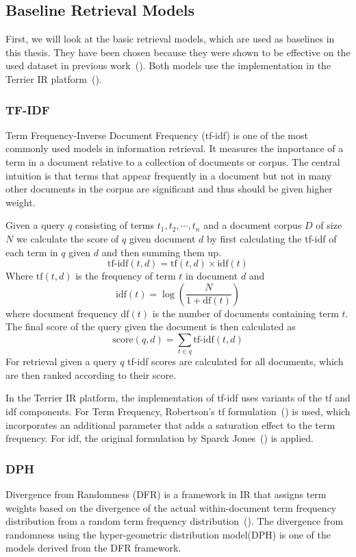 \subsection{Baseline Retrieval Models}\label{sec:baseline-retrieval-models}
First, we will look at the basic retrieval models, which are used as baselines in this thesis.
They have been chosen because they were shown to be effective on the used dataset in previous work~(\cite{goeuriot:2021:Consumer}).
Both models use the implementation in the Terrier IR platform~(\cite{ounis:2005:Terrier}).

\subsubsection{TF-IDF}\label{sec:tf-idf}
Term Frequency-Inverse Document Frequency (tf-idf) is one of the most commonly used models in information retrieval.
It measures the importance of a term in a document relative to a collection of documents or corpus.
The central intuition is that terms that appear frequently in a document but not in many other documents in the corpus are significant and thus should be given higher weight.

Given a query \( q \) consisting of terms \( t_1,t_2,\cdots,t_n \) and a document corpus \( D \) of size \( N \) we calculate the score of \( q \) given document \( d \) by first calculating the tf-idf of each term  in \( q \) given \( d \) and then summing them up.
\[ \text{tf-idf}(t, d) = \text{tf}(t, d) \times \text{idf}(t) \]
Where \( \text{tf}(t, d) \) is the frequency of term \( t \) in document \( d \) and 
\[ \text{idf}(t) = \log \left( \frac{N}{1 + \text{df}(t)} \right) \]
where document frequency \( \text{df}(t) \) is the number of documents containing term \( t \).
The final score of the query given the document is then calculated as
\[ \text{score}(q, d) = \sum_{t \in q} \text{tf-idf}(t, d) \]
For retrieval given a query \( q \) tf-idf scores are calculated for all documents, which are then ranked according to their score.

In the Terrier IR platform, the implementation of tf-idf uses variants of the tf and idf components.
For Term Frequency, Robertson's tf formulation~(\cite{robertson:2004:Understanding}) is used, which incorporates an additional parameter that adds a saturation effect to the term frequency.
For idf, the original formulation by Sparck Jones~(\cite{sparck:1972:A}) is applied.

\subsubsection{DPH}\label{sec:dph}
Divergence from Randomness (DFR) is a framework in IR that assigns term weights based on the divergence of the actual within-document term frequency distribution from a random term frequency distribution~(\cite{amati:2006:Frequentist}).
The divergence from randomness using the hyper-geometric distribution model(DPH) is one of the models derived from the DFR framework.

